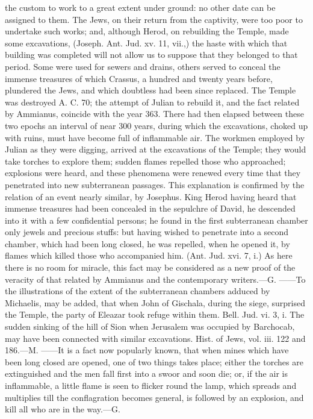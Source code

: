 {the custom to work to a great extent under ground: no other date
can be assigned to them. The Jews, on their return from the
captivity, were too poor to undertake such works; and, although
Herod, on rebuilding the Temple, made some excavations, (Joseph.
Ant. Jud. xv. 11, vii.,) the haste with which that building was
completed will not allow us to suppose that they belonged to that
period. Some were used for sewers and drains, others served to
conceal the immense treasures of which Crassus, a hundred and
twenty years before, plundered the Jews, and which doubtless had
been since replaced. The Temple was destroyed A. C. 70; the
attempt of Julian to rebuild it, and the fact related by
Ammianus, coincide with the year 363. There had then elapsed
between these two epochs an interval of near 300 years, during
which the excavations, choked up with ruins, must have become
full of inflammable air. The workmen employed by Julian as they
were digging, arrived at the excavations of the Temple; they
would take torches to explore them; sudden flames repelled those
who approached; explosions were heard, and these phenomena were
renewed every time that they penetrated into new subterranean
passages. This explanation is confirmed by the relation of an
event nearly similar, by Josephus. King Herod having heard that
immense treasures had been concealed in the sepulchre of David,
he descended into it with a few confidential persons; he found in
the first subterranean chamber only jewels and precious stuffs:
but having wished to penetrate into a second chamber, which had
been long closed, he was repelled, when he opened it, by flames
which killed those who accompanied him. (Ant. Jud. xvi. 7, i.) As
here there is no room for miracle, this fact may be considered as
a new proof of the veracity of that related by Ammianus and the
contemporary writers.—G. ——To the illustrations of the extent of
the subterranean chambers adduced by Michaelis, may be added,
that when John of Gischala, during the siege, surprised the
Temple, the party of Eleazar took refuge within them. Bell. Jud.
vi. 3, i. The sudden sinking of the hill of Sion when Jerusalem
was occupied by Barchocab, may have been connected with similar
excavations. Hist. of Jews, vol. iii. 122 and 186.—M. ——It is a
fact now popularly known, that when mines which have been long
closed are opened, one of two things takes place; either the
torches are extinguished and the men fall first into a swoor and
soon die; or, if the air is inflammable, a little flame is seen
to flicker round the lamp, which spreads and multiplies till the
conflagration becomes general, is followed by an explosion, and
kill all who are in the way.—G.}

